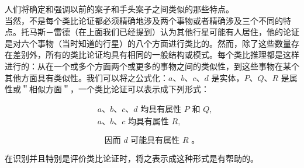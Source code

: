 人们将确定和强调以前的案子和手头案子之间类似的那些特点。\\
当然，不是每个类比论证都必须精确地涉及两个事物或者精确涉及三个不同的特点。托马斯－雷德（在上面我们已经提到）认为其他行星可能有人居住，他的论证是对六个事物（当时知道的行星）的八个方面进行类比的。然而，除了这些数量存在差别外，所有的类比论证均具有相同的一般结构或模式。每个类比推理都是这样进行的：从在一个或多个方面两个或更多的事物之间的类似性，到这些事物在某个其他方面具有类似性。我们可以将之公式化：$a 、 b 、 c 、 d$ 是实体，$P 、 Q 、 R$ 是属性或＂相似方面＂，一个类比论证可以表示成下列形式：

$$
\begin{aligned}
& a 、 b 、 c 、 d \text { 均具有属性 } P \text { 和 } Q, \\
& a 、 b 、 c \text { 均具有属性 } R,
\end{aligned}
$$

$$
\text { 因而 } d \text { 可能具有属性 } R \text { 。 }
$$

在识别并且特别是评价类比论证时，将之表示成这种形式是有帮助的。